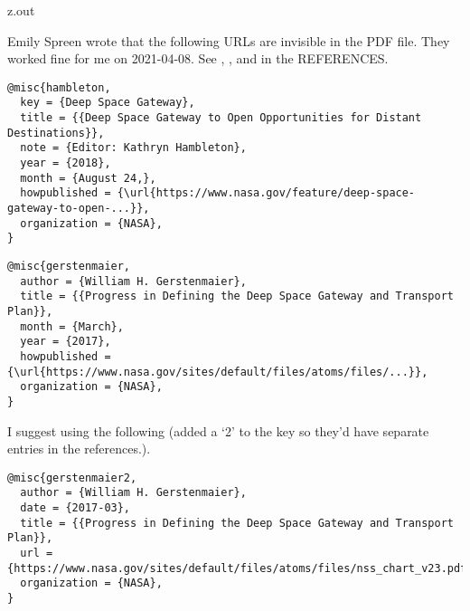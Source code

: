 \MyIO


\begin{VerbatimOut}{z.out}

Emily Spreen wrote that the following URLs are invisible in the PDF file.
They worked fine for me on 2021-04-08.
See \cite{hambleton}, \cite{gerstenmaier}, and \cite{gerstenmaier2} in the REFERENCES.

{\footnotesize
\begin{verbatim}
@misc{hambleton,
  key = {Deep Space Gateway},
  title = {{Deep Space Gateway to Open Opportunities for Distant Destinations}},
  note = {Editor: Kathryn Hambleton},
  year = {2018},
  month = {August 24,},
  howpublished = {\url{https://www.nasa.gov/feature/deep-space-gateway-to-open-...}},
  organization = {NASA},
}
\end{verbatim}
}

{\footnotesize
\begin{verbatim}
@misc{gerstenmaier,
  author = {William H. Gerstenmaier},
  title = {{Progress in Defining the Deep Space Gateway and Transport Plan}},
  month = {March},
  year = {2017},
  howpublished = {\url{https://www.nasa.gov/sites/default/files/atoms/files/...}},
  organization = {NASA},
}
\end{verbatim}
}

I suggest using the following
(added a `2' to the key so they'd have separate entries in the references.).
{\footnotesize
\begin{verbatim}
@misc{gerstenmaier2,
  author = {William H. Gerstenmaier},
  date = {2017-03},
  title = {{Progress in Defining the Deep Space Gateway and Transport Plan}},
  url = {https://www.nasa.gov/sites/default/files/atoms/files/nss_chart_v23.pdf},
  organization = {NASA},
}
\end{verbatim}
}
\end{VerbatimOut}


\MyIO
